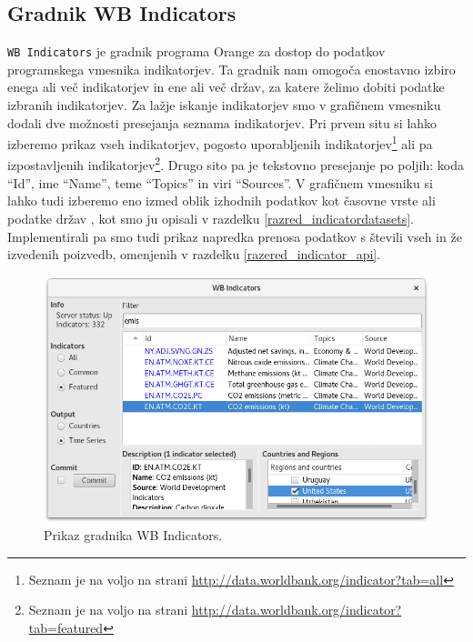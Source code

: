 \subsection{Gradnik WB Indicators}

\verb|WB Indicators| je gradnik programa Orange za dostop do podatkov
programskega vmesnika indikatorjev. Ta gradnik nam omogoča enostavno izbiro
enega ali več indikatorjev in ene ali več držav, za katere želimo dobiti
podatke izbranih indikatorjev. Za lažje iskanje indikatorjev smo v grafičnem
vmesniku dodali dve možnosti presejanja seznama indikatorjev. Pri prvem situ
si lahko izberemo prikaz vseh indikatorjev, pogosto uporabljenih 
indikatorjev\footnote{Seznam je na voljo na strani 
\url{http://data.worldbank.org/indicator?tab=all}}
ali pa izpostavljenih indikatorjev\footnote{Seznam je na voljo na strani 
\url{http://data.worldbank.org/indicator?tab=featured}}. Drugo sito pa je
tekstovno presejanje po poljih: koda ``Id'', ime ``Name'', teme ``Topics'' in
viri ``Sources''. 
V grafičnem vmesniku si lahko tudi izberemo eno izmed oblik izhodnih podatkov
kot časovne vrste  ali podatke držav , 
kot smo ju opisali v razdelku \ref{razred_indicatordatasets}. 
Implementirali pa smo tudi prikaz napredka prenosa podatkov s števili vseh in
že izvedenih poizvedb, omenjenih v razdelku \ref{razered_indicator_api}.


\begin{figure}
\begin{center}
\includegraphics[width=12cm]{pic/co2_temp_indicator_selection.png}
\end{center}
\caption{Prikaz gradnika WB Indicators.}
\label{co2_temp_indicator}
\end{figure} 




